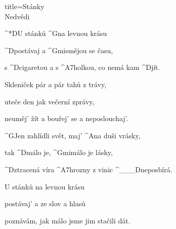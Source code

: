 \begin{song}{title=\predtitle\centering Stánky \\\large Nedvědi \vspace*{-0.3cm}}  %
\begin{centerjustified}
\nejnejvetsi

\sloka
	^*{D}U\: stánků ^{G}na levnou krásu

	^{D\z}postávaj a ^{Gmi\z}smějou se času,

	s ^{D\z}cigaretou a s ^{A7\z}holkou, co nemá kam ^{D}jít.

\sloka
	Skleniček pár a pár tahů z trávy,
   	
   	uteče den jak večerní zprávy,
   	
   	neuměj' žít a bouřej' se a neposlouchaj'.

	^{G}Jen zahlídli svět, maj' ^{A}na duši vrásky,

	tak ^{D\z}málo je, ^{Gmi}málo je lásky,

	^{D\z}ztracená víra ^{A7\z}hrozny z vinic ^{{\color{white}\_\_\_}D}neposbírá.

\sloka
	U stánků na levnou krásu
   	
   	postávaj' a ze slov a hlasů
   	
   	poznávám, jak málo jsme jim stačili dát.




\end{centerjustified}
\setcounter{Slokočet}{0}
\end{song}
